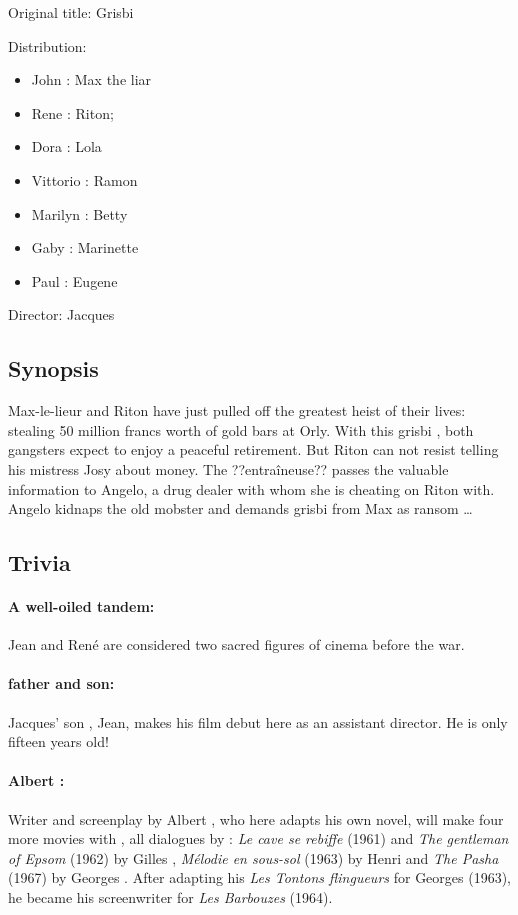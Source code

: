 Original title: Grisbi

Distribution:

\begin{itemize}
    \item John : Max the liar
    \item Rene : Riton;
    \item Dora : Lola
    \item Vittorio : Ramon
    \item Marilyn : Betty
    \item Gaby : Marinette
    \item Paul : Eugene
\end{itemize}

Director: Jacques 

\subsection*{Synopsis}

Max-le-lieur and Riton have just pulled off the greatest heist of their lives: stealing 50
million francs worth of gold bars at Orly. With this \og grisbi \fg{}, both
gangsters expect to enjoy a peaceful retirement. But Riton can not
resist telling his mistress Josy about money. The ??entraîneuse?? passes the
valuable information to Angelo, a drug dealer with whom she is cheating on Riton with. Angelo kidnaps the old mobster and demands \og grisbi \fg{} from Max as ransom \dots

\subsection*{Trivia} 

\paragraph{A well-oiled tandem:} Jean  and René
 are considered two sacred figures of cinema 
before the war.
\paragraph{ father and son:} Jacques' son
 , Jean, makes his film debut here as an assistant
director. He is only fifteen years old!
\paragraph{Albert :} Writer and screenplay by Albert
, who here adapts  his own novel, will make four more movies with , all dialogues by : \emph{Le cave se rebiffe} (1961) and \emph{The gentleman of Epsom} (1962) by Gilles , \emph{Mélodie en sous-sol} (1963) by Henri
 and \emph{The Pasha} (1967) by Georges . After adapting his \emph{Les Tontons flingueurs} for Georges  (1963), he became his screenwriter for \emph{Les Barbouzes}
(1964).

